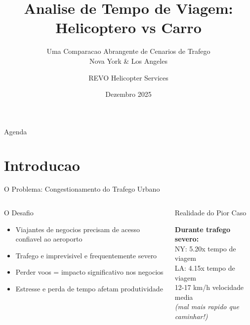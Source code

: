 \documentclass[aspectratio=169,9pt]{beamer}
\title[\textbf{Analise Helicoptero vs Carro}]{\textbf{Analise de Tempo de Viagem:\\Helicoptero vs Carro}}
\subtitle{Uma Comparacao Abrangente de Cenarios de Trafego\\Nova York \& Los Angeles}
\author{REVO Helicopter Services}
\institute{Divisao de Analise Estrategica}
\date{Dezembro 2025}
\begin{document}
\begin{frame}
\titlepage
\end{frame}

\begin{frame}{Agenda}
\tableofcontents
\end{frame}

\section{Introducao}

\begin{frame}{O Problema: Congestionamento do Trafego Urbano}
\begin{columns}
\begin{block}{O Desafio}
\begin{itemize}
    \item Viajantes de negocios precisam de acesso confiavel ao aeroporto
    \item Trafego e imprevisivel e frequentemente severo
    \item Perder voos = impacto significativo nos negocios
    \item Estresse e perda de tempo afetam produtividade
\end{itemize}
\end{block}

\begin{alertblock}{Realidade do Pior Caso}
\begin{center}
\textbf{Durante trafego severo:}\\[0.3em]
\large{NY: \textcolor{revoRed}{5.20x}} \small{tempo de viagem}\\[0.2em]
\large{LA: \textcolor{revoRed}{4.15x}} \small{tempo de viagem}\\[0.2em]
\large{\textcolor{revoRed}{12-17 km/h}} \small{velocidade media}\\[0.2em]
\footnotesize{\textit{(mal mais rapido que caminhar!)}}
\end{center}
\end{alertblock}
\end{columns}
\end{frame}
\end{document}
